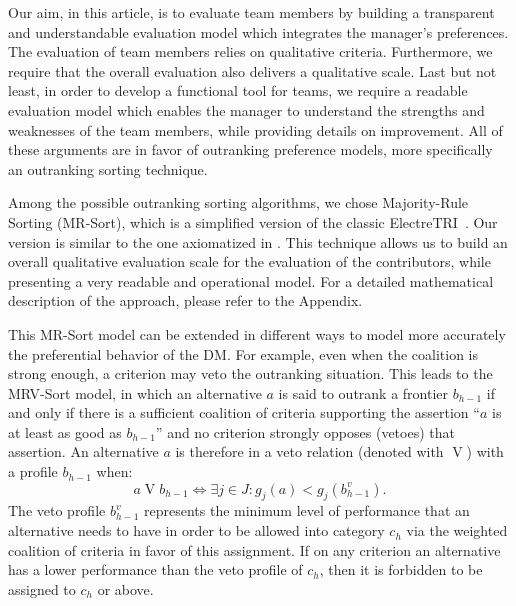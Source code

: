 

Our aim, in this article, is to evaluate team members by building a transparent and understandable evaluation model which integrates the manager's preferences. The evaluation of team members relies on qualitative criteria. Furthermore, we require that the overall evaluation also delivers a qualitative scale. Last but not least, in order to develop a functional tool for teams, we require a readable evaluation model which enables the manager to understand the strengths and weaknesses of the team members, while providing details on improvement. All of these arguments are in favor of outranking preference models, more specifically an outranking sorting technique.

Among the possible outranking sorting algorithms, we chose Majority-Rule Sorting (MR-Sort), which is a simplified version of the classic ElectreTRI~\citep{FMR05,mousseauuseroriented2000,royoutranking1991}. Our version is similar to the one axiomatized in \citep{bouyssouaxiomatic2007-1,bouyssouaxiomatic2007-2}. This technique allows us to build an overall qualitative evaluation scale for the evaluation of the contributors, while presenting a very readable and operational model. For a detailed mathematical description of the approach, please refer to the Appendix. %

This MR-Sort model can be extended in different ways to model more accurately the preferential behavior of the DM. For example, even when the coalition is strong enough, a criterion may veto the outranking situation. This leads to the MRV-Sort model, in which an alternative $a$ is said to outrank a frontier $b_{h-1}$ if and only if there is a sufficient coalition of criteria supporting the assertion ``$a$ is at least as good as $b_{h-1}$'' and no criterion strongly opposes (vetoes) that assertion. An alternative $a$ is therefore in a veto relation (denoted with $\operatorname{V}$) with a profile $b_{h-1}$ when:
\begin{equation}
	a\operatorname{V}b_{h-1} \iff \exists j\in J: g_j(a) < g_j(b^{v}_{h-1}).\label{eq:binaryveto}
\end{equation}
The veto profile $b^{v}_{h-1}$ represents the minimum level of performance that an alternative needs to have in order to be allowed into category $c_h$ via the weighted coalition of criteria in favor of this assignment. If on any criterion an alternative has a lower performance than the veto profile of $c_h$, then it is forbidden to be assigned to $c_h$ or above. 

